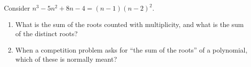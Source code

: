 Consider $n^3-5n^2+8n-4=(n-1)(n-2)^2$.
\begin{enumerate}
\item[(a)] What is the sum of the roots counted with multiplicity, and what is the sum of the distinct roots?
\item[(b)] When a competition problem asks for ``the sum of the roots'' of a polynomial, which of these is normally meant?
\end{enumerate}
